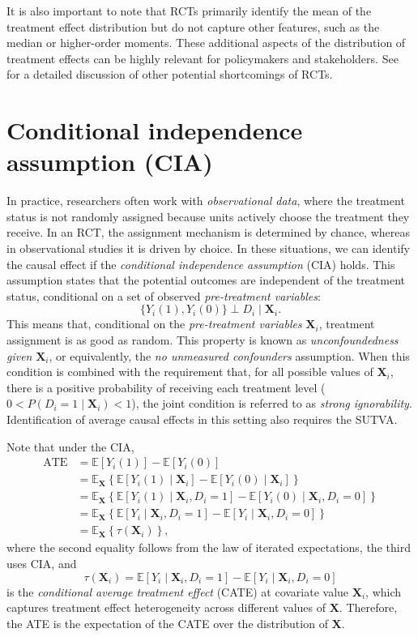It is also important to note that RCTs primarily identify the mean of the treatment effect distribution but do not capture other features, such as the median or higher-order moments. These additional aspects of the distribution of treatment effects can be highly relevant for policymakers and stakeholders. See \cite{deaton2010instruments} for a detailed discussion of other potential shortcomings of RCTs.


\section{Conditional independence assumption (CIA)}\label{chap12_3}

In practice, researchers often work with \textit{observational data}, where the treatment status is not randomly assigned because units actively choose the treatment they receive. In an RCT, the assignment mechanism is determined by chance, whereas in observational studies it is driven by choice. In these situations, we can identify the causal effect if the \textit{conditional independence assumption} (CIA) holds. This assumption states that the potential outcomes are independent of the treatment status, conditional on a set of observed  \textit{pre-treatment variables}:
\[
\{ Y_i(1), Y_i(0) \} \perp D_i \mid \mathbf{X}_i.
\]
This means that, conditional on the \textit{pre-treatment variables} $\mathbf{X}_i$, treatment assignment is as good as random. This property is known as \textit{unconfoundedness given} $\mathbf{X}_i$, or equivalently, the \textit{no unmeasured confounders} assumption. When this condition is combined with the requirement that, for all possible values of $\mathbf{X}_i$, there is a positive probability of receiving each treatment level ($0 < P(D_i = 1 \mid \mathbf{X}_i) < 1$), the joint condition is referred to as \textit{strong ignorability}. Identification of average causal effects in this setting also requires the SUTVA.

Note that under the CIA,
\begin{align*}
	\text{ATE} &= \mathbb{E}[Y_i(1)] - \mathbb{E}[Y_i(0)] \\
	&= \mathbb{E}_{\mathbf{X}}\left\{ \mathbb{E}[Y_i(1)\mid \mathbf{X}_i] - \mathbb{E}[Y_i(0)\mid \mathbf{X}_i] \right\} \\
	&= \mathbb{E}_{\mathbf{X}}\left\{ \mathbb{E}[Y_i(1)\mid \mathbf{X}_i, D_i=1] - \mathbb{E}[Y_i(0)\mid \mathbf{X}_i, D_i=0] \right\} \\
	&= \mathbb{E}_{\mathbf{X}}\left\{ \mathbb{E}[Y_i\mid \mathbf{X}_i, D_i=1] - \mathbb{E}[Y_i\mid \mathbf{X}_i, D_i=0] \right\} \\
	&= \mathbb{E}_{\mathbf{X}}\left\{ \tau(\mathbf{X}_i) \right\},
\end{align*}
where the second equality follows from the law of iterated expectations, the third uses CIA, and
\[
\tau(\mathbf{X}_i) = \mathbb{E}[Y_i \mid \mathbf{X}_i, D_i=1] - \mathbb{E}[Y_i \mid \mathbf{X}_i, D_i=0]
\]
is the \textit{conditional average treatment effect} (CATE) at covariate value $\mathbf{X}_i$, which captures treatment effect heterogeneity across different values of $\mathbf{X}$. Therefore, the ATE is the expectation of the CATE over the distribution of $\mathbf{X}$.

